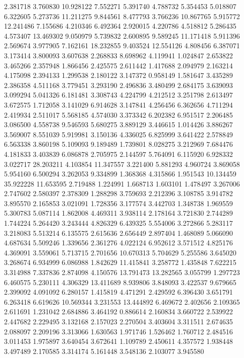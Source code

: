 2.381718
3.760830
10.928122
7.552271
5.391740
4.788732
5.354453
5.018807
6.322605
5.273736
11.211275
9.844561
8.477793
3.766236
10.867765
5.915772
12.241486
7.155686
4.210346
6.492364
2.920015
4.220786
4.518812
5.286435
4.573407
13.469302
9.050979
5.739832
2.600895
9.589245
11.171418
5.911396
2.569674
3.977905
7.162161
18.232855
9.403524
12.554126
4.808456
6.387071
3.173414
3.800093
3.607638
2.268833
8.698962
4.119941
1.024847
2.653822
3.465266
2.357948
1.866456
2.425575
2.611442
1.417688
2.094979
2.163214
4.175098
2.394133
1.299538
2.180122
3.147372
0.958149
1.581647
3.435289
2.386358
4.511168
3.779451
3.293190
2.496836
3.480499
2.684175
3.639093
3.099294
5.041326
6.181481
3.308743
4.224799
4.212512
3.251798
2.613497
3.672575
1.712058
3.141029
6.914628
3.147841
4.256456
6.362656
4.711294
2.419934
2.511017
5.568185
4.574030
3.373342
6.202382
6.951517
2.206485
3.086500
4.558738
9.546593
5.680275
3.889129
3.446615
1.014426
3.886267
3.569007
8.551039
5.919981
3.150136
4.336025
6.825999
3.641422
2.578849
6.563338
3.860198
5.109093
9.189489
1.739801
8.028275
3.212969
7.684476
4.181833
3.403839
6.086878
2.705975
2.144597
5.764091
6.115920
6.928332
3.022717
28.203211
4.103854
11.347557
3.221400
5.881293
4.960724
3.869058
5.954160
6.500294
3.262053
9.334899
1.368368
4.315866
1.951543
10.134459
35.922228
11.653595
2.719488
1.224991
1.668713
1.603101
1.478497
3.267006
2.747602
2.580397
2.378309
1.288298
3.759693
2.212396
3.108785
3.914782
3.895570
2.165853
3.021091
1.728356
3.177574
3.442703
1.348738
1.969559
5.300783
5.087114
1.862008
4.469311
3.938114
2.178164
3.721830
2.744289
1.744224
5.264420
3.243444
4.826329
6.439325
5.554006
3.272866
5.283117
3.218083
5.513214
6.135575
2.615636
2.656449
2.897404
1.468089
5.066090
4.687634
5.509246
1.339656
2.361276
4.022124
6.952612
3.571512
4.825176
4.369091
3.559061
5.713715
2.701656
10.670313
5.704629
5.255586
3.645020
3.268674
6.934999
6.086988
1.842629
11.415841
3.258772
1.435848
7.622215
3.314988
7.337836
2.874098
4.150576
13.791473
13.282565
3.055799
1.297723
6.460575
5.230111
4.306329
13.411689
8.939806
3.848093
3.422537
9.679665
2.399092
4.091092
6.280157
1.415819
4.471291
2.429592
6.396430
3.651791
6.263418
6.619626
10.569344
3.231553
13.444892
6.469672
2.402656
2.109365
2.611691
1.231042
2.684886
3.464192
0.886614
2.160834
3.660722
2.539922
2.447682
2.229495
3.132168
2.157023
2.270504
3.403604
3.311511
2.674635
2.088097
2.209196
3.313066
1.630563
1.971746
1.526462
1.760712
2.484516
3.011453
1.975897
3.640454
3.672641
1.109789
2.450611
4.357572
1.938448
3.497489
2.170585
3.314174
5.161448
3.548136
2.103077
3.945580
